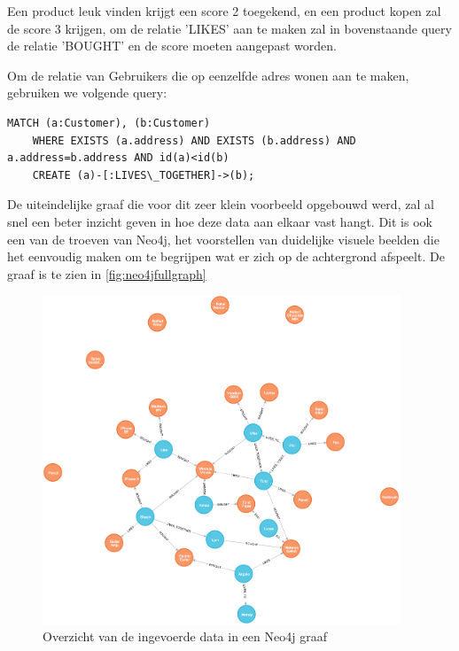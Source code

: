 Een product leuk vinden krijgt een score 2 toegekend, en een product kopen zal de score 3 krijgen, om de relatie 'LIKES' aan te maken zal in bovenstaande query de relatie 'BOUGHT' en de score moeten aangepast worden.

Om de relatie van Gebruikers die op eenzelfde adres wonen aan te maken, gebruiken we volgende query: 

\begin{lstlisting}[caption={Neo4j query voor het aanmaken van een relatie tussen een twee klanten.}]
	MATCH (a:Customer), (b:Customer) 
	WHERE EXISTS (a.address) AND EXISTS (b.address) AND a.address=b.address AND id(a)<id(b) 
	CREATE (a)-[:LIVES\_TOGETHER]->(b); 
\end{lstlisting}

De uiteindelijke graaf die voor dit zeer klein voorbeeld opgebouwd werd, zal al snel een beter inzicht geven in hoe deze data aan elkaar vast hangt. Dit is ook een van de troeven van Neo4j, het voorstellen van duidelijke visuele beelden die het eenvoudig maken om te begrijpen wat er zich op de achtergrond afspeelt. De graaf is te zien in \autoref{fig:neo4jfullgraph}
\newpage

\begin{figure} [h!]
	\centering
	\includegraphics[width=0.95\textwidth]{img/full_graph_result}
	\caption{Overzicht van de ingevoerde data in een Neo4j graaf}
	\label{fig:neo4jfullgraph}
\end{figure}


